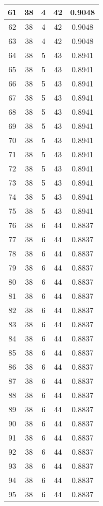 \documentclass[letterpaper, 12pt]{article}
\begin{document}
\begin{longtable}{|c|c|c|c|c|}
61 & 38 & 4 & 42 & 0.9048 \\
\hline
62 & 38 & 4 & 42 & 0.9048 \\
\hline
63 & 38 & 4 & 42 & 0.9048 \\
\hline
64 & 38 & 5 & 43 & 0.8941 \\
\hline
65 & 38 & 5 & 43 & 0.8941 \\
\hline
66 & 38 & 5 & 43 & 0.8941 \\
\hline
67 & 38 & 5 & 43 & 0.8941 \\
\hline
68 & 38 & 5 & 43 & 0.8941 \\
\hline
69 & 38 & 5 & 43 & 0.8941 \\
\hline
70 & 38 & 5 & 43 & 0.8941 \\
\hline
71 & 38 & 5 & 43 & 0.8941 \\
\hline
72 & 38 & 5 & 43 & 0.8941 \\
\hline
73 & 38 & 5 & 43 & 0.8941 \\
\hline
74 & 38 & 5 & 43 & 0.8941 \\
\hline
75 & 38 & 5 & 43 & 0.8941 \\
\hline
76 & 38 & 6 & 44 & 0.8837 \\
\hline
77 & 38 & 6 & 44 & 0.8837 \\
\hline
78 & 38 & 6 & 44 & 0.8837 \\
\hline
79 & 38 & 6 & 44 & 0.8837 \\
\hline
80 & 38 & 6 & 44 & 0.8837 \\
\hline
81 & 38 & 6 & 44 & 0.8837 \\
\hline
82 & 38 & 6 & 44 & 0.8837 \\
\hline
83 & 38 & 6 & 44 & 0.8837 \\
\hline
84 & 38 & 6 & 44 & 0.8837 \\
\hline
85 & 38 & 6 & 44 & 0.8837 \\
\hline
86 & 38 & 6 & 44 & 0.8837 \\
\hline
87 & 38 & 6 & 44 & 0.8837 \\
\hline
88 & 38 & 6 & 44 & 0.8837 \\
\hline
89 & 38 & 6 & 44 & 0.8837 \\
\hline
90 & 38 & 6 & 44 & 0.8837 \\
\hline
91 & 38 & 6 & 44 & 0.8837 \\
\hline
92 & 38 & 6 & 44 & 0.8837 \\
\hline
93 & 38 & 6 & 44 & 0.8837 \\
\hline
94 & 38 & 6 & 44 & 0.8837 \\
\hline
95 & 38 & 6 & 44 & 0.8837 \\

\end{longtable}
\end{document}
